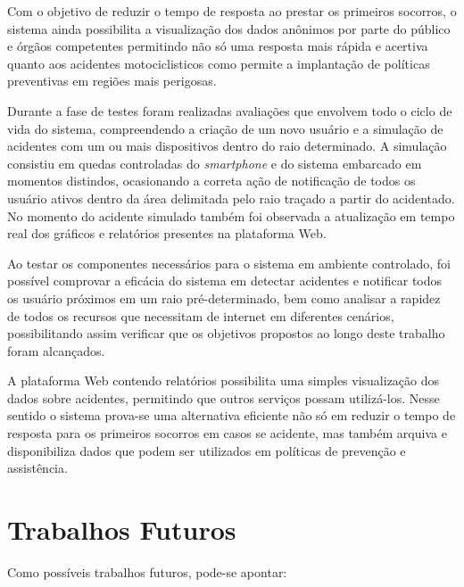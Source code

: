 Com o objetivo de reduzir o tempo de resposta ao prestar os primeiros socorros, o sistema ainda possibilita a visualização dos dados anônimos por parte do público e órgãos competentes permitindo não só uma resposta mais rápida e acertiva quanto aos acidentes motociclisticos como permite a implantação de políticas preventivas em regiões mais perigosas.

Durante a fase de testes foram realizadas avaliações que envolvem todo o ciclo de vida do sistema, compreendendo a criação de um novo usuário e a simulação de acidentes com um ou mais dispositivos dentro do raio determinado. A simulação consistiu em quedas controladas do \textit{smartphone} e do sistema embarcado em momentos distindos, ocasionando a correta ação de notificação de todos os usuário ativos dentro da área delimitada pelo raio traçado a partir do acidentado. No momento do acidente simulado também foi observada a atualização em tempo real dos gráficos e relatórios presentes na plataforma Web.

Ao testar os componentes necessários para o sistema em ambiente controlado, foi possível comprovar a eficácia do sistema em detectar acidentes e notificar todos os usuário próximos em um raio pré-determinado, bem como analisar a rapidez de todos os recursos que necessitam de internet em diferentes cenários, possibilitando assim verificar que os objetivos propostos ao longo deste trabalho foram alcançados.

A plataforma Web contendo relatórios possibilita uma simples visualização dos dados sobre acidentes, permitindo que outros serviços possam utilizá-los. Nesse sentido o sistema prova-se uma alternativa eficiente não só em reduzir o tempo de resposta para os primeiros socorros em casos se acidente, mas também arquiva e disponibiliza dados que podem ser utilizados em políticas de prevenção e assistência.




\clearpage

\section{Trabalhos Futuros}

Como possíveis trabalhos futuros, pode-se apontar:

